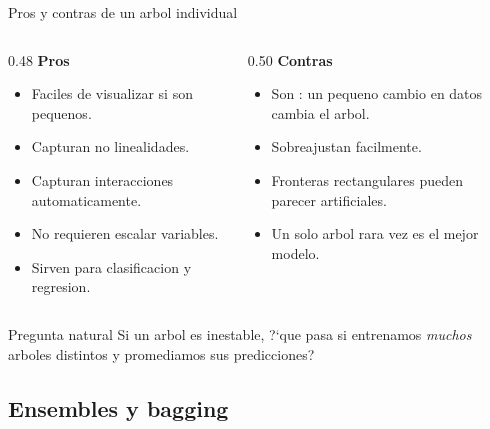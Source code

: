 \begin{frame}{Pros y contras de un arbol individual}
\begin{columns}[T,onlytextwidth]
\begin{column}{0.48\textwidth}
\small
\textbf{Pros}
\begin{itemize}\footnotesize
  \item Faciles de visualizar si son pequenos.
  \item Capturan no linealidades.
  \item Capturan interacciones automaticamente.
  \item No requieren escalar variables.
  \item Sirven para clasificacion y regresion.
\end{itemize}
\end{column}
\begin{column}{0.50\textwidth}
\small
\textbf{Contras}
\begin{itemize}\footnotesize
  \item Son : un pequeno cambio en datos cambia el arbol.
  \item Sobreajustan facilmente.
  \item Fronteras rectangulares pueden parecer artificiales.
  \item Un solo arbol rara vez es el mejor modelo.
\end{itemize}
\end{column}
\end{columns}

\vspace{0.4em}
\begin{block}{Pregunta natural}
\small
Si un arbol es inestable, ?`que pasa si entrenamos \emph{muchos} arboles distintos y promediamos sus predicciones?
\end{block}
\end{frame}

\subsection{Ensembles y bagging}

